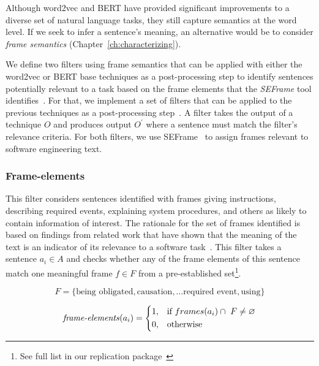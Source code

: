 


Although word2vec and BERT have provided significant improvements to a diverse set of natural language tasks, 
they still capture semantics at the word level. 
If we seek to infer a sentence's meaning, an alternative would be to consider  \textit{frame semantics} (Chapter~\ref{ch:characterizing}).


We define two filters using frame semantics that can be
applied with either the word2vec or BERT base techniques as
 a post-processing step to identify sentences potentially relevant to a task based on the frame elements that the \textit{SEFrame} tool identifies~\cite{marques2020}.
For that, we implement a set of filters that can be applied to the previous techniques as a post-processing step~\cite{Manning2009IR}.
A filter takes the output of a technique $O$ and produces output $O^{\prime}$ where a sentence must match the filter's relevance criteria. For both filters, we use SEFrame~\cite{marques2021} to assign frames relevant to
software engineering text.





\subsubsection{Frame-elements}

This filter considers sentences identified with
frames giving instructions, describing required events, explaining system procedures, and others as
 likely to contain information of interest. The rationale for
 the set of frames identified is based on findings from related work that have shown that 
the meaning of the text is an indicator of its relevance to a software task~\cite{marques2020}.
This filter takes a sentence $a_i \in A$ and checks whether any of the frame elements
of this sentence match one meaningful frame $f \in F$ from a pre-established set\footnote{\label{full-list}See full list in our replication package~\cite{supplementary_material}}. 

\begin{small}
\begin{equation}
F = \{ \text{being obligated}, \text{causation}, \dots \text{required event}, \text{using} \} 
\end{equation}

\begin{equation}
\text{\textit{frame-elements}}(a_i) = \left \{
\begin{aligned}
    &1, && \text{if}\ frames(a_i) \cap ~F \ne \emptyset \\
    &0, && \text{otherwise}
\end{aligned} \right.
\end{equation} 
\end{small}



